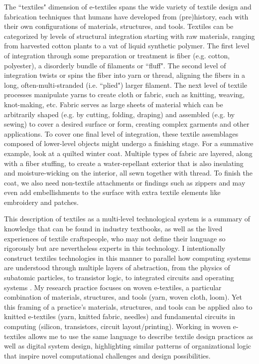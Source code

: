 The ``textiles" dimension of e-textiles spans the wide variety of textile design and fabrication techniques that humans have developed from (pre)history, each with their own configurations of materials, structures, and tools. Textiles can be categorized by levels of structural integration starting with raw materials, ranging from harvested cotton plants to a vat of liquid synthetic polymer. \todo{[45,60]} The first level of integration through some preparation or treatment is fiber (e.g. cotton, polyester), a disorderly bundle of filaments or ``fluff". The second level of integration twists or spins the fiber into yarn or thread, aligning the fibers in a long, often-multi-stranded (i.e. ``plied") larger filament. The next level of textile processes manipulate yarns to create cloth or fabric, such as knitting, weaving, knot-making, etc. Fabric serves as large sheets of material which can be arbitrarily shaped (e.g. by cutting, folding, draping) and assembled (e.g. by sewing) to cover a desired surface or form, creating complex garments and other applications. To cover one final level of integration, these textile assemblages composed of lower-level objects might undergo a finishing stage. For a summative example, look at a quilted winter coat. Multiple types of fabric are layered, along with a fiber stuffing, to create a water-repellant exterior that is also insulating and moisture-wicking on the interior, all sewn together with thread. To finish the coat, we also need non-textile attachments or findings such as zippers and may even add embellishments to the surface with extra textile elements like embroidery and patches.

This description of textiles as a multi-level technological system is a summary of knowledge that can be found in industry textbooks, as well as the lived experiences of textile craftspeople, who may not define their language so rigorously but are nevertheless experts in this technology. I intentionally construct textiles technologies in this manner to parallel how computing systems are understood through multiple layers of abstraction, from the physics of subatomic particles, to transistor logic, to integrated circuits and operating systems \todo{[57]}. My research practice focuses on woven e-textiles, a particular combination of materials, structures, and tools (yarn, woven cloth, loom). Yet this framing of a practice's materials, structures, and tools can be applied also to knitted e-textiles (yarn, knitted fabric, needles) and fundamental circuits in computing (silicon, transistors, circuit layout/printing). Working in woven e-textiles allows me to use the same language to describe textile design practices as well as digital system design, highlighting similar patterns of organizational logic that inspire novel computational challenges and design possibilities.

